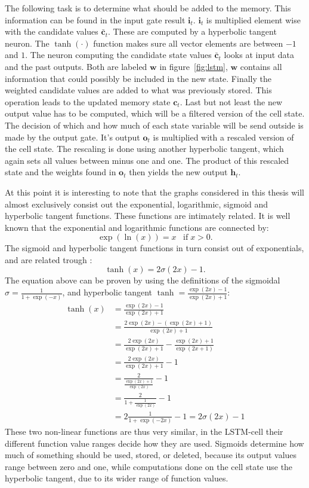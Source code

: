 The following task is to determine what should be added to the memory. This information can be found in the input gate result $\mathbf{i}_t$. $\mathbf{i}_t$ is multiplied element wise with the candidate values $\mathbf{\bar{c}}_t$. These are computed by a hyperbolic tangent neuron.  The $\tanh(\cdot)$ function makes sure all vector elements are between $-1$ and $1$. The neuron computing the candidate state values $\mathbf{\bar{c}}_t$ looks at input data and the past outputs. Both are labeled $\mathbf{w}$ in figure~\ref{fig:lstm}, $\mathbf{w}$ contains all information that could possibly be included in the new state. Finally the weighted candidate values are added to what was previously stored. This operation leads to the updated memory state $\mathbf{c}_t$.
Last but not least the new output value has to be computed, which will be a filtered version of the cell state. The decision of which and how much of each state variable will be send outside is made by the output gate. It's output $\mathbf{o}_t$ is multiplied with a rescaled version of the cell state. The rescaling is done using another hyperbolic tangent, which again sets all values between minus one and one. The product of this rescaled state and the weights found in $\mathbf{o}_t$ then yields the new output $\mathbf{h}_t$.

At this point it is interesting to note that the graphs considered in this thesis will almost exclusively consist
out the exponential, logarithmic, sigmoid and hyperbolic tangent functions. These functions are intimately related. It is well known that the exponential and logarithmic functions are connected by:
\begin{equation}
\exp(\ln(x)) = x \;\;\; \text{if} \; x > 0.
\end{equation}
The sigmoid and hyperbolic tangent functions in turn consist out of exponentials, and are related trough \cite[page 15]{Graves2008}:
\begin{equation}
\tanh(x) = 2\sigma(2x) - 1.
\end{equation}
The equation above can be proven by using the definitions of the sigmoidal $\sigma = \frac{1}{1 + \exp(-x)}$, and hyperbolic tangent $\tanh = \frac{\exp(2x) - 1}{\exp(2x) + 1}$:
\begin{align}
\tanh(x) &= \frac{\exp(2x) - 1}{\exp(2x) + 1} \\
&= \frac{2\exp(2x) - (\exp(2x) + 1)}{\exp(2x) + 1} \\
&= \frac{2 \exp(2x)}{\exp(2x) + 1} - \frac{\exp(2x) + 1}{\exp(2x + 1)} \\
&= \frac{2 \exp(2x)}{\exp(2x) + 1} - 1 \\
&= \frac{2}{\frac{\exp(2x) + 1}{\exp(2x)}} - 1 \\
&= \frac{2}{1 + \frac{1}{\exp(2x)}} - 1 \\
&= 2\frac{1}{1 + \exp(-2x)} - 1 = 2\sigma(2x) - 1
\end{align}
These two non-linear functions are thus very similar, in the LSTM-cell their different function value ranges decide how they are used. Sigmoids determine how much of something should be used, stored, or deleted, because its output values range between zero and one, while computations done on the cell state use the hyperbolic tangent, due to its wider range of function values.



